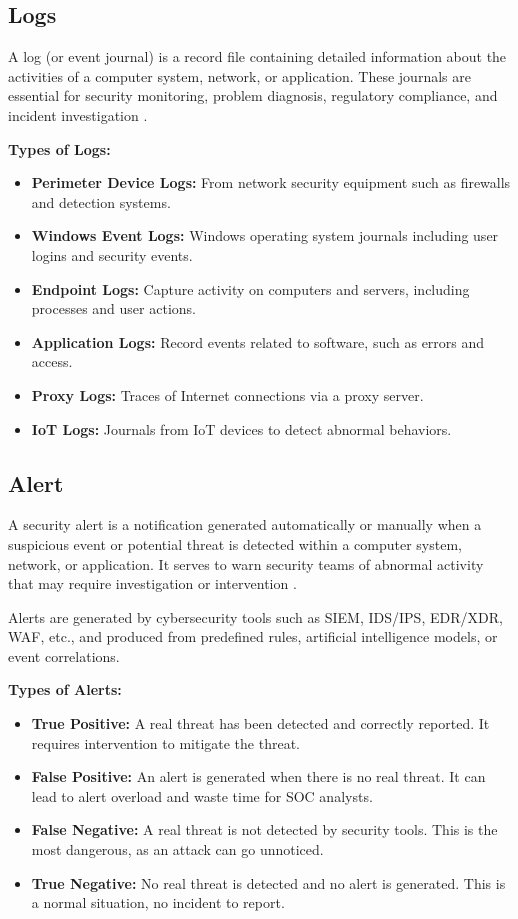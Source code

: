 \subsection{Logs}
\label{subsec:logs}

A log (or event journal) is a record file containing detailed information about the activities of a computer system, network, or application. These journals are essential for security monitoring, problem diagnosis, regulatory compliance, and incident investigation \cite{ref25} \cite{ref26}.

\textbf{Types of Logs:}

\begin{itemize}
    \item \textbf{Perimeter Device Logs:} From network security equipment such as firewalls and detection systems.
    \item \textbf{Windows Event Logs:} Windows operating system journals including user logins and security events.
    \item \textbf{Endpoint Logs:} Capture activity on computers and servers, including processes and user actions.
    \item \textbf{Application Logs:} Record events related to software, such as errors and access.
    \item \textbf{Proxy Logs:} Traces of Internet connections via a proxy server.
    \item \textbf{IoT Logs:} Journals from IoT devices to detect abnormal behaviors.
\end{itemize}

\subsection{Alert}
\label{subsec:alert}

A security alert is a notification generated automatically or manually when a suspicious event or potential threat is detected within a computer system, network, or application. It serves to warn security teams of abnormal activity that may require investigation or intervention \cite{ref27}.

Alerts are generated by cybersecurity tools such as SIEM, IDS/IPS, EDR/XDR, WAF, etc., and produced from predefined rules, artificial intelligence models, or event correlations.

\textbf{Types of Alerts:}

\begin{itemize}
    \item \textbf{True Positive:} A real threat has been detected and correctly reported. It requires intervention to mitigate the threat.
    \item \textbf{False Positive:} An alert is generated when there is no real threat. It can lead to alert overload and waste time for SOC analysts.
    \item \textbf{False Negative:} A real threat is not detected by security tools. This is the most dangerous, as an attack can go unnoticed.
    \item \textbf{True Negative:} No real threat is detected and no alert is generated. This is a normal situation, no incident to report.
\end{itemize}

